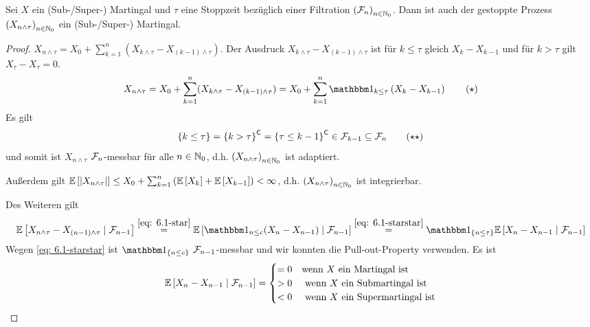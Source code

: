 \begin{theorem}
	\label{theorem: 6.1}
	Sei $X$ ein (Sub-/Super-) Martingal und $\tau$ eine Stoppzeit bezüglich einer Filtration $\left( \mathcal{F}_n \right)_{n \in \mathbb{N}_0}$. Dann ist auch der gestoppte Prozess $\left( X_{n \land \tau} \right)_{n \in \mathbb{N}_0}$ ein (Sub-/Super-) Martingal.
\end{theorem}
\begin{proof}
	$X_{n \land \tau} = X_0 + \sum_{k=1}^n (X_{k \land \tau} - X_{(k-1) \land \tau})$. Der Ausdruck $X_{k \land \tau} - X_{(k-1) \land \tau}$ ist für $k \le \tau$ gleich $X_k - X_{k-1}$ und für $k > \tau$ gilt $X_\tau - X_\tau = 0$.
	\begin{equation*}
		X_{n \land \tau} = X_0 + \sum_{k=1}^n (X_{k \land \tau} - X_{(k-1) \land \tau}) = X_0 + \sum_{k=1}^n \one_{k \le \tau} \brackets{X_k - X_{k-1}} 
		\tag{$\star$} \label{eq: 6.1-star}
	\end{equation*}
	Es gilt
	\begin{equation*}
		\left\{ k \le \tau \right\} = \left\{ k > \tau \right\}^{\mathsf{C}} = \left\{ \tau \le k-1 \right\}^{\mathsf{C}} \in \mathcal{F}_{k-1} \subseteq \mathcal{F}_n 
		\tag{$\star\star$} \label{eq: 6.1-starstar}
	\end{equation*}
	und somit ist $X_{n \land \tau}$ $\mathcal{F}_n$-messbar für alle $n \in \mathbb{N}_0$, d.h. $\left( X_{n \land \tau} \right)_{n \in \mathbb{N}_0}$ ist adaptiert.
	
	Außerdem gilt $\mathbb{E} \left[ \left| X_{n \land \tau} \right| \right] \le X_0 + \sum_{k=1}^n \left( \mathbb{E} \left[ X_k \right] + \mathbb{E} \left[ X_{k-1} \right] \right) < \infty$, d.h. $\left( X_{n \land \tau} \right)_{n \in \mathbb{N}_0}$ ist integrierbar.
	
	Des Weiteren gilt
	\begin{equation*}
		\EW[X_{n \land \tau} - X_{(n-1) \land \tau} \mid \F_{n-1}] \overset{\eqref{eq: 6.1-star}}{=} \EW[\one_{n \le c} (X_n - X_{n-1}) \mid \F_{n-1}]  \overset{\eqref{eq: 6.1-starstar}}{=} \one_{\menge{n \le \tau}} \EW[X_n - X_{n-1} \mid \F_{n-1}]
	\end{equation*}
	Wegen \eqref{eq: 6.1-starstar} ist $\one_{\menge{n \le c}}$ $\mathcal{F}_{n-1}$-messbar und wir konnten die Pull-out-Property verwenden. Es ist
	\begin{equation*}
		\mathbb{E} \left[ X_n - X_{n-1} \mid \mathcal{F}_{n-1} \right] = \begin{cases}
		= 0 &\text{wenn $X$ ein Martingal ist} \\
		> 0 &\text{ wenn $X$ ein Submartingal ist} \\
		< 0 &\text{ wenn $X$ ein Supermartingal ist}
		\end{cases}
	\end{equation*}
\end{proof}

